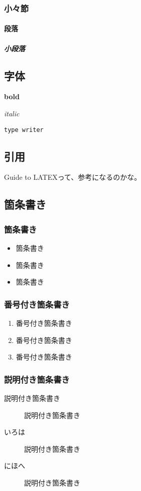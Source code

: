 \documentclass[main]{subfiles}
\begin{document}
\subsubsection*{小々節}

\paragraph*{段落}
\jalipsumiroha

\subparagraph*{小段落}
\jalipsumiroha


\subsection{字体}

\textbf{bold}

\textit{italic}

\texttt{type writer}


\subsection{引用}
Guide to LATEX\cite{kopka2003guide}って、参考になるのかな。

\subsection{箇条書き}

\subsubsection{箇条書き}
\begin{itemize}
  \item 箇条書き
  \item 箇条書き
  \item 箇条書き
\end{itemize}


\subsubsection{番号付き箇条書き}
\begin{enumerate}
  \item 番号付き箇条書き
  \item 番号付き箇条書き
  \item 番号付き箇条書き
\end{enumerate}


\subsubsection{説明付き箇条書き}
\begin{description}
  \item[説明付き箇条書き] 説明付き箇条書き
  \item[いろは] 説明付き箇条書き
  \item[にほへ] 説明付き箇条書き
\end{description}
\end{document}
